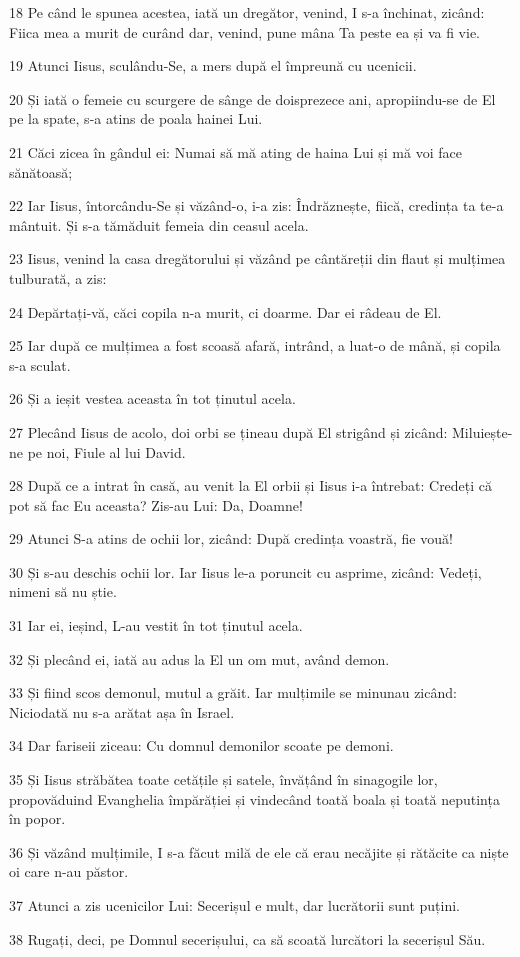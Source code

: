 \par 18 Pe când le spunea acestea, iată un dregător, venind, I s-a închinat, zicând: Fiica mea a murit de curând dar, venind, pune mâna Ta peste ea și va fi vie.
\par 19 Atunci Iisus, sculându-Se, a mers după el împreună cu ucenicii.
\par 20 Și iată o femeie cu scurgere de sânge de doisprezece ani, apropiindu-se de El pe la spate, s-a atins de poala hainei Lui.
\par 21 Căci zicea în gândul ei: Numai să mă ating de haina Lui și mă voi face sănătoasă;
\par 22 Iar Iisus, întorcându-Se și văzând-o, i-a zis: Îndrăznește, fiică, credința ta te-a mântuit. Și s-a tămăduit femeia din ceasul acela.
\par 23 Iisus, venind la casa dregătorului și văzând pe cântăreții din flaut și mulțimea tulburată, a zis:
\par 24 Depărtați-vă, căci copila n-a murit, ci doarme. Dar ei râdeau de El.
\par 25 Iar după ce mulțimea a fost scoasă afară, intrând, a luat-o de mână, și copila s-a sculat.
\par 26 Și a ieșit vestea aceasta în tot ținutul acela.
\par 27 Plecând Iisus de acolo, doi orbi se țineau după El strigând și zicând: Miluiește-ne pe noi, Fiule al lui David.
\par 28 După ce a intrat în casă, au venit la El orbii și Iisus i-a întrebat: Credeți că pot să fac Eu aceasta? Zis-au Lui: Da, Doamne!
\par 29 Atunci S-a atins de ochii lor, zicând: După credința voastră, fie vouă!
\par 30 Și s-au deschis ochii lor. Iar Iisus le-a poruncit cu asprime, zicând: Vedeți, nimeni să nu știe.
\par 31 Iar ei, ieșind, L-au vestit în tot ținutul acela.
\par 32 Și plecând ei, iată au adus la El un om mut, având demon.
\par 33 Și fiind scos demonul, mutul a grăit. Iar mulțimile se minunau zicând: Niciodată nu s-a arătat așa în Israel.
\par 34 Dar fariseii ziceau: Cu domnul demonilor scoate pe demoni.
\par 35 Și Iisus străbătea toate cetățile și satele, învățând în sinagogile lor, propovăduind Evanghelia împărăției și vindecând toată boala și toată neputința în popor.
\par 36 Și văzând mulțimile, I s-a făcut milă de ele că erau necăjite și rătăcite ca niște oi care n-au păstor.
\par 37 Atunci a zis ucenicilor Lui: Secerișul e mult, dar lucrătorii sunt puțini.
\par 38 Rugați, deci, pe Domnul secerișului, ca să scoată lurcători la secerișul Său.

